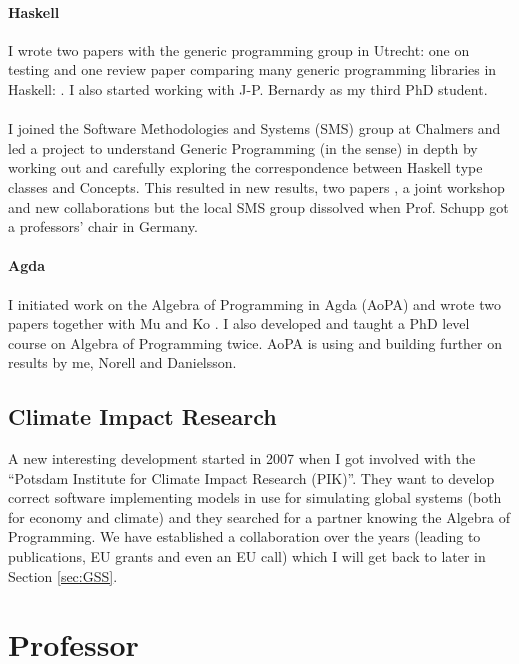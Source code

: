 \paragraph{Haskell} I wrote two papers with the generic programming
group in Utrecht: one on testing \citep{janssonjeuring2007:Testing} and
one review paper comparing many generic programming libraries in Haskell:
\citep{Rodriguezetal2008:CompGenLib}.
%
I also started working with J-P. Bernardy as my third PhD student.


\paragraph{\Cpp} I joined the Software Methodologies and Systems (SMS)
group at Chalmers and led a project to understand Generic Programming
(in the \Cpp{} sense) in depth by working out and carefully exploring the
correspondence between Haskell type classes and \Cpp{} Concepts.
%
This resulted in new results, two papers \citep{SMS-Bernardy:2008:CCC,
  bernardy_generic_2010}, a joint workshop \citep{wgp09proceedings} and
new collaborations but the local SMS group dissolved when Prof. Schupp got a
professors' chair in Germany.

\paragraph{Agda} I initiated work on the Algebra of Programming in
Agda (AoPA) and wrote two papers together with Mu and Ko
\citep{mukojansson08:mpc:dcc, MuKoJansson2009AoPA}.
%
I also developed and taught a PhD level course on Algebra of
Programming twice.
%
AoPA is using and building further on results by me, Norell and
Danielsson.
%

\subsection{Climate Impact Research}
A new interesting development started in 2007 when I got involved with
the ``Potsdam Institute for Climate Impact Research (PIK)''.
%
They want to develop correct software implementing models in use for
simulating global systems (both for economy and climate) and they
searched for a partner knowing the Algebra of Programming.
%
We have established a collaboration over the years (leading to
publications, EU grants and even an EU call) which I will get back to
later in Section \ref{sec:GSS}.


\section{Professor}

